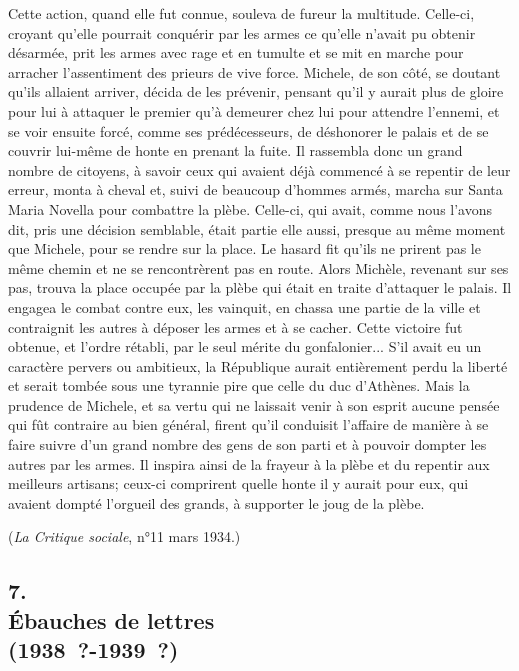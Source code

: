 \documentclass[french,twoside]{book} %
\newenvironment{quoteblock}%
  {\begin{quoting}}
  {\end{quoting}}
\newenvironment{quotebar}{%
    \def\FrameCommand{{\color{rubric!10!}\vrule width 0.5em} \hspace{0.9em}}%
    \def\OuterFrameSep{\itemsep} %
    \MakeFramed {\advance\hsize-\width \FrameRestore}
  }%
  {%
    \endMakeFramed
  }
\renewenvironment{quoteblock}%
  {%
    \savenotes
    \setstretch{0.9}
    \normalfont
    \begin{quotebar}
  }
  {%
    \end{quotebar}
    \spewnotes
  }
\begin{document}
\begin{quoteblock}
 Cette action, quand elle fut connue, souleva de fureur la multitude. Celle-ci, croyant qu'elle pourrait conquérir par les armes ce qu'elle n'avait pu obtenir désarmée, prit les armes avec rage et en tumulte et se mit en marche pour arracher l'assentiment des prieurs de vive force. Michele, de son côté, se dou­tant qu'ils allaient arriver, décida de les prévenir, pensant qu'il y aurait plus de gloire pour lui à attaquer le premier qu'à demeurer chez lui pour attendre l'ennemi, et se voir ensuite forcé, comme ses prédécesseurs, de déshonorer le palais et de se couvrir lui-même de honte en prenant la fuite. Il rassembla donc un grand nombre de citoyens, à savoir ceux qui avaient déjà commencé à se repentir de leur erreur, monta à cheval et, suivi de beaucoup d'hommes armés, marcha sur Santa Maria Novella pour combattre la plèbe. Celle-ci, qui avait, comme nous l'avons dit, pris une décision semblable, était partie elle aussi, presque au même moment que Michele, pour se rendre sur la place. Le hasard fit qu'ils ne prirent pas le même chemin et ne se rencontrèrent pas en route. Alors Michèle, revenant sur ses pas, trouva la place occupée par la plèbe qui était en traite d'attaquer le palais. Il engagea le combat contre eux, les vainquit, en chassa une partie de la ville et contraignit les autres à déposer les armes et à se cacher. Cette victoire fut obtenue, et l'ordre rétabli, par le seul mérite du gonfalonier... S'il avait eu un caractère pervers ou ambitieux, la République aurait entièrement perdu la liberté et serait tombée sous une tyrannie pire que celle du duc d'Athènes. Mais la prudence de Michele, et sa vertu qui ne laissait venir à son esprit aucune pensée qui fût contraire au bien général, firent qu'il conduisit l'affaire de manière à se faire suivre d'un grand nombre des gens de son parti et à pouvoir dompter les autres par les armes. Il inspira ainsi de la frayeur à la plèbe et du repentir aux meilleurs artisans; ceux-ci comprirent quelle honte il y aurait pour eux, qui avaient dompté l'orgueil des grands, à supporter le joug de la plèbe.
 \end{quoteblock}

\noindent ({\itshape La Critique sociale}, n°11 mars 1934.)
\subsection[{7. Ébauches de lettres  (1938 ?-1939 ?)}]{7. \\
Ébauches de lettres \protect\footnotemark  \\
(1938 ?-1939 ?)}
\noindent \par
\end{document}
